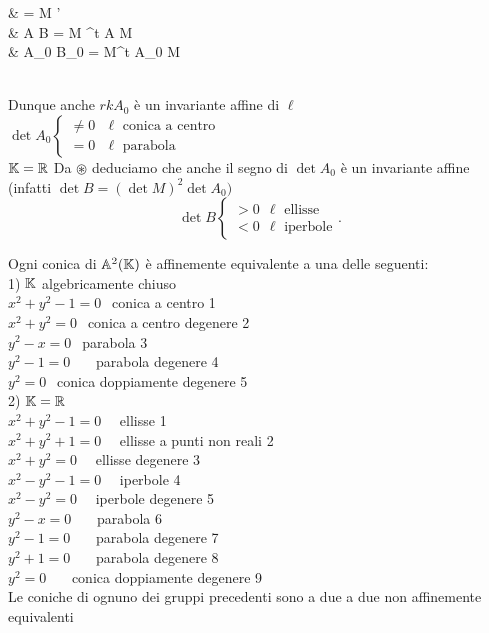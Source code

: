 \documentclass[12px]{article}
\begin{document}
	\begin{aligend}
		&  = \widetilde M \widetilde{\underline{X}}'\\
		& A \leftrightarrow B = \widetilde M ^t A \widetilde M\\
		& A_0 \leftrightarrow B_0 = M^t A_0 M \circledast
	\end{aligend}\\
	Dunque anche $rk A_0$ è un invariante affine di $\ell$ \\
	$\det A_0 \begin{cases}
		\neq 0 \ \ \ \ell \text{ conica a centro }\\
		=0 \ \ \ \ell \text{ parabola}
	\end{cases}$\\
	$\mathbb{K} = \mathbb{R}$ Da  $\circledast$ deduciamo che anche il segno di $\det A_0$ è un invariante affine (infatti $\det B = (\det M)^2 \det A_0)$\\
	\[
	 \det B  \begin{cases}
		 >0 \ \ \ell \text{ ellisse}\\
		 < 0 \ \ \ell \text{ iperbole}
	 \end{cases}
	.\] 
	\begin{teo}
		Ogni conica di $\mathbb{A}^2(\mathbb{K})$ è affinemente equivalente a una delle seguenti:\\
		1) $\mathbb{K}$ algebricamente chiuso \\
		$x^2 + y^2 - 1 = 0 \ \ $ conica a centro 1\\
		$x^2 + y^2 = 0 \ \ $ conica a centro degenere 2\\
		$y^2 -x = 0 \ \ $ parabola 3\\
		 $y^2-1=0$ \ \ \ parabola degenere 4\\
		 $y^2 = 0\ \ $ conica doppiamente degenere 5\\
		 2)  $\mathbb{K} = \mathbb{R}$\\
		  $x^2 + y^2 - 1 = 0$ \ \ ellisse 1\\
		  $x^2 + y^2 + 1 = 0$ \ \ ellisse a punti non reali 2\\
		  $x^2 + y^2 = 0$ \ \ ellisse degenere 3\\
		  $x^2 - y^2 -1 =0$ \ \ iperbole 4\\
		  $x^2 - y^2 = 0$ \ \ iperbole degenere 5\\
		  $y^2 - x =0 $ \ \ \ parabola 6\\
		  $y^2-1 = 0$ \ \ \ parabola degenere 7\\
		  $ y^2 + 1 = 0$ \ \ \ parabola degenere 8\\
		  $y^2 = 0$ \ \ \ conica doppiamente degenere 9 \\
 		  Le coniche di ognuno dei gruppi precedenti sono a due a due non affinemente equivalenti
	\end{teo}
\end{document}
